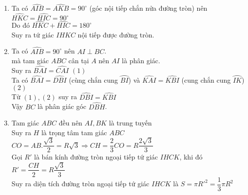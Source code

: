 \begin{ex}
{\begin{center}
\end{center}
\begin{enumerate}
\item Ta có $\widehat{AIB}=\widehat{AKB}=90^\circ$ (góc nội tiếp chắn nửa đường tròn)
nên $\widehat{HKC}=\widehat{HIC}=90^\circ$\\
Do đó $\widehat{HKC}+\widehat{HIC}=180^\circ$\\
Suy ra tứ giác $IHKC$ nội tiếp được đường tròn.
\item Ta có $\widehat{AIB}=90^\circ$ nên $AI \perp BC$.\\
mà tam giác $ABC$ cân tại $A$ nên $AI$ là phân giác.\\
Suy ra $\widehat{BAI}=\widehat{CAI}$ \hfill $(1)$\\
Ta có $\widehat{BAI}=\widehat{DBI}$ (cùng chắn cung $\wideparen{BI}$) và $\widehat{KAI}=\widehat{KBI}$ (cung chắn cung $\wideparen{IK}$) \hfill $(2)$\\
Từ $(1), (2)$ suy ra $\widehat{DBI}=\widehat{KBI}$\\
Vậy $BC$ là phân giác góc $\widehat{DBH}$.
\item Tam giác $ABC$ đều nên $AI, BK$ là trung tuyến\\
Suy ra $H$ là trọng tâm tam giác $ABC$\\
$CO=AB.\dfrac{\sqrt{3}}{2}=R\sqrt{3} \Rightarrow CH=\dfrac{2}{3}CO=R\dfrac{2\sqrt{3}}{3}$\\
Gọi $R'$ là bán kính đường tròn ngoại tiếp tứ giác $IHCK$, khi đó $R'=\dfrac{CH}{2}=R \dfrac{\sqrt{3}}{3}$\\
Suy ra diện tích đường tròn ngoại tiếp tứ giác $IHCK$ là $S=\pi R'^2 = \dfrac{1}{3} \pi R^2$
\end{enumerate} 
    }
\end{ex}

